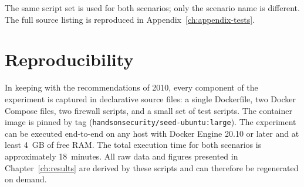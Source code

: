 The same script set is used for both scenarios; only the scenario name is different. The full source listing is reproduced in Appendix~\ref{ch:appendix-tests}.

\section{Reproducibility}

In keeping with the recommendations of \textcite{Sommer and Paxson}{2010}, every component of the experiment is captured in declarative source files: a single Dockerfile, two Docker Compose files, two firewall scripts, and a small set of test scripts. The container image is pinned by tag (\texttt{handsonsecurity/seed-ubuntu:large}). The experiment can be executed end-to-end on any host with Docker Engine 20.10 or later and at least 4~GB of free RAM. The total execution time for both scenarios is approximately 18~minutes. All raw data and figures presented in Chapter~\ref{ch:results} are derived by these scripts and can therefore be regenerated on demand.

